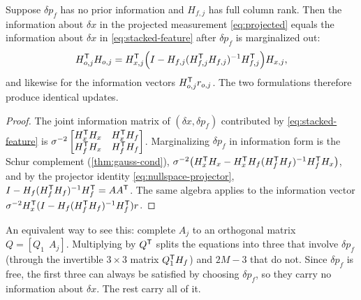 \begin{theorem}
\label{thm:nullspace-optimal}
Suppose $\delta p_f$ has no prior information and $H_{f,j}$ has full column rank. Then the information about $\delta x$ in the
projected measurement \eqref{eq:projected} equals the information about $\delta x$ in \eqref{eq:stacked-feature} after $\delta p_f$ is marginalized
out:
\begin{equation}
  H_{o,j}^{\mathsf{T}} H_{o,j} = H_{x,j}^{\mathsf{T}}\Big(I - H_{f,j}(H_{f,j}^{\mathsf{T}} H_{f,j})^{-1} H_{f,j}^{\mathsf{T}}\Big)H_{x,j},
\end{equation}
and likewise for the information vectors $H_{o,j}^{\mathsf{T}} r_{o,j}$. The two formulations therefore produce identical updates.
\end{theorem}
\begin{proof}
The joint information matrix of $(\delta x, \delta p_f)$ contributed by \eqref{eq:stacked-feature} is
$\sigma^{-2}\begin{bmatrix} H_x^{\mathsf{T}} H_x & H_x^{\mathsf{T}} H_f \\ H_f^{\mathsf{T}} H_x & H_f^{\mathsf{T}} H_f\end{bmatrix}$. Marginalizing $\delta p_f$ in information form is the Schur
complement (\cref{thm:gauss-cond}), $\sigma^{-2}\big(H_x^{\mathsf{T}} H_x - H_x^{\mathsf{T}} H_f(H_f^{\mathsf{T}} H_f)^{-1} H_f^{\mathsf{T}} H_x\big)$, and by the projector identity
\eqref{eq:nullspace-projector}, $I - H_f(H_f^{\mathsf{T}} H_f)^{-1} H_f^{\mathsf{T}} = A A^{\mathsf{T}}$. The same algebra applies to the information vector
$\sigma^{-2}H_x^{\mathsf{T}}(I - H_f(H_f^{\mathsf{T}} H_f)^{-1} H_f^{\mathsf{T}})r$.
\end{proof}

An equivalent way to see this: complete $A_j$ to an orthogonal matrix $Q = [Q_1\ \ A_j]$. Multiplying by $Q^{\mathsf{T}}$ splits the equations
into three that involve $\delta p_f$ (through the invertible $3\times3$ matrix $Q_1^{\mathsf{T}} H_f$) and $2M - 3$ that do not. Since $\delta p_f$ is free,
the first three can always be satisfied by choosing $\delta p_f$, so they carry no information about $\delta x$. The rest carry all
of it.

